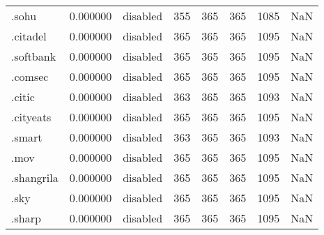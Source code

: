 \begin{tabular}{lrlrrrrl}
.sohu                     &          0.000000 &        disabled &                         355 &                         365 &                         365 &                1085 &                  NaN \\
.citadel                  &          0.000000 &        disabled &                         365 &                         365 &                         365 &                1095 &                  NaN \\
.softbank                 &          0.000000 &        disabled &                         365 &                         365 &                         365 &                1095 &                  NaN \\
.comsec                   &          0.000000 &        disabled &                         365 &                         365 &                         365 &                1095 &                  NaN \\
.citic                    &          0.000000 &        disabled &                         363 &                         365 &                         365 &                1093 &                  NaN \\
.cityeats                 &          0.000000 &        disabled &                         365 &                         365 &                         365 &                1095 &                  NaN \\
.smart                    &          0.000000 &        disabled &                         363 &                         365 &                         365 &                1093 &                  NaN \\
.mov                      &          0.000000 &        disabled &                         365 &                         365 &                         365 &                1095 &                  NaN \\
.shangrila                &          0.000000 &        disabled &                         365 &                         365 &                         365 &                1095 &                  NaN \\
.sky                      &          0.000000 &        disabled &                         365 &                         365 &                         365 &                1095 &                  NaN \\
.sharp                    &          0.000000 &        disabled &                         365 &                         365 &                         365 &                1095 &                  NaN \\

\end{tabular}
